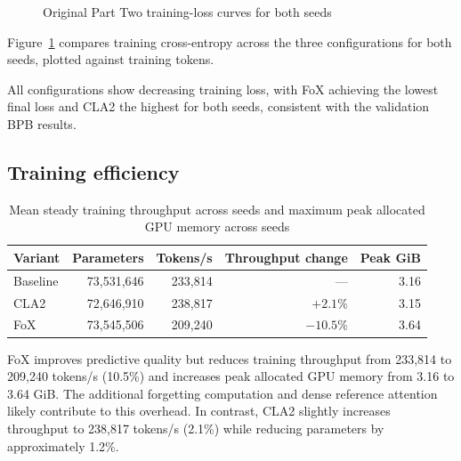 \documentclass[11pt]{article}
\begin{document}
\begin{figure}[htbp]
\begin{minipage}{0.49\linewidth}
\end{minipage}
\caption{Original Part Two training-loss curves for both seeds}
\label{fig:part2-training-loss}
\end{figure}
Figure~\ref{fig:part2-training-loss} compares training
cross-entropy across the three configurations for both
seeds, plotted against training tokens.

All configurations show decreasing training loss,
with FoX achieving the lowest final loss and CLA2
the highest for both seeds, consistent with the
validation BPB results.

\newpage

\subsection{Training efficiency}
\begin{table}[htbp]
\centering
\small
\begin{tabular}{lrrrr}
\hline
Variant & Parameters & Tokens/s & Throughput change & Peak GiB\\
\hline
Baseline & 73,531,646 & 233,814 & --- & 3.16\\
CLA2 & 72,646,910 & 238,817 & $+2.1\%$ & 3.15\\
FoX & 73,545,506 & 209,240 & $-10.5\%$ & 3.64\\
\hline
\end{tabular}
\caption{Mean steady training throughput across seeds and maximum peak
allocated GPU memory across seeds}
\end{table}
FoX improves predictive quality but reduces training
throughput from 233,814 to 209,240 tokens/s (10.5\%)
and increases peak allocated GPU memory from 3.16
to 3.64 GiB. The additional forgetting computation
and dense reference attention likely contribute to
this overhead. In contrast, CLA2 slightly increases
throughput to 238,817 tokens/s (2.1\%) while reducing
parameters by approximately 1.2\%.
\end{document}
